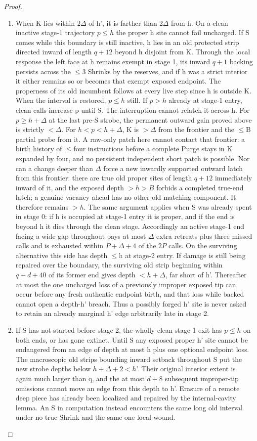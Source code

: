 \begin{proof}
\begin{enumerate}
\item When K lies within 2\(\Delta\) of h', it is farther than 2\(\Delta\) from h. On a clean inactive stage-1 trajectory \(p\le h\) the proper h site cannot fail uncharged. If S comes while this boundary is still inactive, h lies in an old protected strip directed inward of length \(q+12\) beyond h disjoint from K. Through the local response the left face at h remains exempt in stage 1, its inward \(q+1\) backing persists across the \(\le\)3 Shrinks by the reserves, and if h was a strict interior it either remains so or becomes that exempt exposed endpoint. The properness of its old incumbent follows at every live step since h is outside K. When the interval is restored, \(p\le h\) still. If \(p>h\) already at stage-1 entry, clean calls increase p until S. The interruption cannot relatch it across h. For \(p\ge h+\Delta \) at the last pre-S strobe, the permanent outward gain proved above is strictly \(<\Delta \). For \(h<p<h+\Delta \), K is \(>\Delta \) from the frontier and the \(\le\)B partial probe from it. A raw-only patch here cannot contact that frontier: a birth history of \(\le\)four instructions before a complete Purge stays in K expanded by four, and no persistent independent short patch is possible. Nor can a change deeper than \(\Delta\) force a new inwardly supported outward latch from this frontier: there are true old proper sites of length \(q+12\) immediately inward of it, and the exposed depth \(>h>B\) forbids a completed true-end latch; a genuine vacancy ahead has no other old matching component. It therefore remains \(>h\). The same argument applies when S was already spent in stage 0: if h is occupied at stage-1 entry it is proper, and if the end is beyond h it dies through the clean stage. Accordingly an active stage-1 end facing a wide gap throughout pays at most \(\Delta\) extra retreats plus three missed calls and is exhausted within \(P+\Delta +4\) of the \(2P\) calls. On the surviving alternative this side has depth \(\le\)h at stage-2 entry. If damage is still being repaired over the boundary, the surviving old strip beginning within \(q+d+40\) of its former end gives depth \(<h+\Delta \), far short of h'. Thereafter at most the one uncharged loss of a previously improper exposed tip can occur before any fresh authentic endpoint birth, and that loss while backed cannot open a depth-h' breach. Thus a possibly forged h' site is never asked to retain an already marginal h' edge arbitrarily late in stage 2.
\item If S has not started before stage 2, the wholly clean stage-1 exit has \(p\le h\) on both ends, or has gone extinct. Until S any exposed proper h' site cannot be endangered from an edge of depth at most h plus one optional endpoint loss. The macroscopic old strips bounding inward setback throughout S put the new strobe depths below \(h+\Delta +2<h\)'. Their original interior extent is again much larger than q, and the at most \(d+8\) subsequent improper-tip omissions cannot move an edge from this depth to h'. Erasure of a remote deep piece has already been localized and repaired by the internal-cavity lemma. An S in computation instead encounters the same long old interval under no true Shrink and the same one local wound.


\end{enumerate}
\end{proof}
